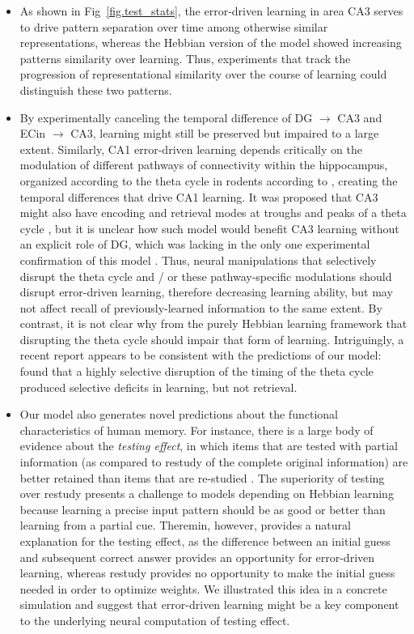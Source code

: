 \documentclass[11pt,twoside]{article}
\newif\myifpdf
\begin{document}
\begin{itemize}
    \item As shown in Fig~\ref{fig.test_stats}, the error-driven learning in area CA3 serves to drive pattern separation over time among otherwise similar representations, whereas the Hebbian version of the model showed increasing patterns similarity over learning.  Thus, experiments that track the progression of representational similarity over the course of learning could distinguish these two patterns.

    \item By experimentally canceling the temporal difference of DG $\rightarrow$ CA3 and ECin $\rightarrow$ CA3, learning might still be preserved but impaired to a large extent.  Similarly, CA1 error-driven learning \citep{KetzMorkondaOReilly13} depends critically on the modulation of different pathways of connectivity within the hippocampus, organized according to the theta cycle in rodents according to \citet{HasselmoBodelonWyble02}, creating the temporal differences that drive CA1 learning.  It was proposed that CA3 might also have encoding and retrieval modes at troughs and peaks of a theta cycle \citep{KunecHasselmoKopell05}, but it is unclear how such model would benefit CA3 learning without an explicit role of DG, which was lacking in the only one experimental confirmation of this model \citep{VillarrealGrossDerrick07}.  Thus, neural manipulations that selectively disrupt the theta cycle and / or these pathway-specific modulations should disrupt error-driven learning, therefore decreasing learning ability, but may not affect recall of previously-learned information to the same extent.  By contrast, it is not clear why from the purely Hebbian learning framework that disrupting the theta cycle should impair that form of learning.  Intriguingly, a recent report appears to be consistent with the predictions of our model: \citet{QuirkZutshiSrikanthEtAl21} found that a highly selective disruption of the timing of the theta cycle produced selective deficits in learning, but not retrieval.

    \item Our model also generates novel predictions about the functional characteristics of human memory. For instance, there is a large body of evidence about the \emph{testing effect}, in which items that are tested with partial information (as compared to restudy of the complete original information) are better retained than items that are re-studied  \citep{LiuOReillyRanganath21}.  The superiority of testing over restudy presents a challenge to models depending on Hebbian learning because learning a precise input pattern should be as good or better than learning from a partial cue. Theremin, however, provides a natural explanation for the testing effect, as the difference between an initial guess and subsequent correct answer provides an opportunity for error-driven learning, whereas restudy provides no opportunity to make the initial guess needed in order to optimize weights.  We illustrated this idea in a concrete simulation and suggest that error-driven learning might be a key component to the underlying neural computation of testing effect.
    
\end{itemize}
\end{document}
